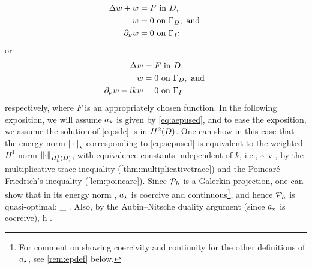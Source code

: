 \begin{subequations}
    \label{eq:sdb}
\begin{align}
  \Delta w + w&= F \text{ in } D,\label{eq:sd4}\\
  w &= 0 \text{ on } \Gamma_{D},\text{ and }\label{eq:sd5}\\
  \partial_{\nu} w &= 0 \text{ on } \Gamma_{I};\label{eq:sd6}
\end{align}
\end{subequations}
or
\begin{subequations}
    \label{eq:sdc}
\begin{align}
  \Delta w &= F \text{ in } D,\label{eq:sd7}\\
  w &= 0 \text{ on } \Gamma_{D},\text{ and }\label{eq:sd8}\\
  \partial_{\nu} w -ikw &= 0 \text{ on } \Gamma_{I}\label{eq:sd9}
\end{align}
\end{subequations}
respectively, where $F$ is an appropriately chosen function. In the following exposition, we will assume $a_{\star}$ is given by \cref{eq:aepused}, and to ease the exposition, we assume the solution of \cref{eq:sdc} is in $\HtD$. One can show in this case that the energy norm $\Nep{\cdot}$ corresponding to \cref{eq:aepused} is equivalent to the weighted $H^1$-norm $\NHokD{\cdot}$, with equivalence constants independent of $k$, i.e.,
\beq\label{eq:aepnormequiv}
 \sim {} \tforall v \in \HozDD,
\eeq
by the multiplicative trace inequality (\cref{thm:multiplicativetrace}) and the Poincar\'e--Friedrich's inequality (\cref{lem:poincare}). Since $\mathcal P_{h}$ is a Galerkin projection, one can show that in its energy norm , $a_{\star}$ is coercive and continuous\footnote{For comment on showing coercivity and continuity for the other definitions of $a_{\star}$, see \cref{rem:epdef} below.}, and hence $\mathcal P_{h}$ is quasi-optimal:
\beq\label{eq:epho}
 \lesssim \inf_{\vh \in \Vhp} .
\eeq
Also, by the Aubin--Nitsche duality argument (since $a_{\star}$ is coercive),
\beq\label{eq:eplt}
 \lesssim h .
\eeq

